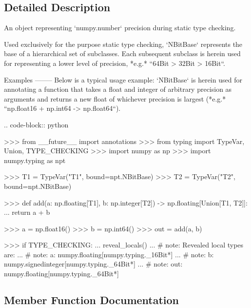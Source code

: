 \subsection{Detailed Description}
\begin{DoxyVerb}An object representing `numpy.number` precision during static type checking.

Used exclusively for the purpose static type checking, `NBitBase`
represents the base of a hierarchical set of subclasses.
Each subsequent subclass is herein used for representing a lower level
of precision, *e.g.* ``64Bit > 32Bit > 16Bit``.

Examples
--------
Below is a typical usage example: `NBitBase` is herein used for annotating a
function that takes a float and integer of arbitrary precision as arguments
and returns a new float of whichever precision is largest
(*e.g.* ``np.float16 + np.int64 -> np.float64``).

.. code-block:: python

    >>> from __future__ import annotations
    >>> from typing import TypeVar, Union, TYPE_CHECKING
    >>> import numpy as np
    >>> import numpy.typing as npt

    >>> T1 = TypeVar("T1", bound=npt.NBitBase)
    >>> T2 = TypeVar("T2", bound=npt.NBitBase)

    >>> def add(a: np.floating[T1], b: np.integer[T2]) -> np.floating[Union[T1, T2]]:
    ...     return a + b

    >>> a = np.float16()
    >>> b = np.int64()
    >>> out = add(a, b)

    >>> if TYPE_CHECKING:
    ...     reveal_locals()
    ...     # note: Revealed local types are:
    ...     # note:     a: numpy.floating[numpy.typing._16Bit*]
    ...     # note:     b: numpy.signedinteger[numpy.typing._64Bit*]
    ...     # note:     out: numpy.floating[numpy.typing._64Bit*]\end{DoxyVerb}
 

\subsection{Member Function Documentation}
\mbox{\label{classnumpy_1_1typing_1_1NBitBase_a89234b85204162e77a9a59608b85369a}} 
